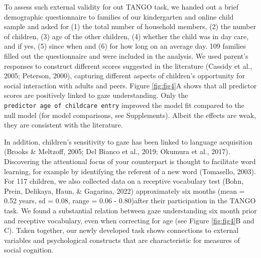 \documentclass[
  man,floatsintext]{apa7}
\begin{document}
To assess such external validity for out TANGO task, we handed out a brief demographic questionnaire to families of our kindergarten and online child sample and asked for (1) the total number of household members, (2) the number of children, (3) age of the other children, (4) whether the child was in day care, and if yes, (5) since when and (6) for how long on an average day.
109 families filled out the questionnaire and were included in the analysis.
We used parent's responses to construct different scores suggested in the literature (Cassidy et al., 2005; Peterson, 2000), capturing different aspects of children's opportunity for social interaction with adults and peers.
Figure \ref{fig:fig4}A shows that all predictor scores are positively linked to gaze understanding. Only the \texttt{predictor\ age\ of\ childcare\ entry} improved the model fit compared to the null model (for model comparisons, see Supplements). Albeit the effects are weak, they are consistent with the literature.

In addition, children's sensitivity to gaze has been linked to language acquisition (Brooks \& Meltzoff, 2005; Del Bianco et al., 2019; Okumura et al., 2017).
Discovering the attentional focus of your counterpart is thought to facilitate word learning, for example by identifying the referent of a new word (Tomasello, 2003).
For 117 children, we also collected data on a receptive vocabulary test (Bohn, Prein, Delikaya, Haun, \& Gagarina, 2022) approximately six months (mean = 0.52 years, sd = 0.08, range = 0.06 - 0.80)after their participation in the TANGO task.
We found a substantial relation between gaze understanding six month prior and receptive vocabulary, even when correcting for age (see Figure \ref{fig:fig4}B and C).
Taken together, our newly developed task shows connections to external variables and psychological constructs that are characteristic for measures of social cognition.
\end{document}
